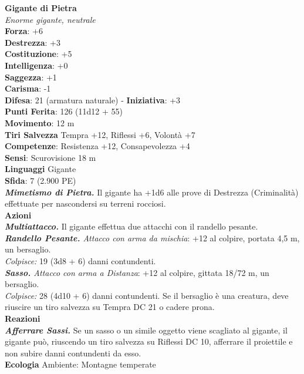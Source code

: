 \begin{multicols}{2}
\medskip\textbf{Gigante di Pietra}\\
\emph{Enorme gigante, neutrale}\\
\textbf{Forza}: +6\\
\textbf{Destrezza}: +3\\
\textbf{Costituzione}: +5\\
\textbf{Intelligenza}: +0\\
\textbf{Saggezza}: +1\\
\textbf{Carisma}: -1\\
\textbf{Difesa}: 21 (armatura naturale) - \textbf{Iniziativa}: +3\\
\textbf{Punti Ferita}: 126 (11d12 + 55)\\
\textbf{Movimento}: 12 m\\
\textbf{Tiri Salvezza} Tempra +12, Riflessi +6, Volontà +7\\
\textbf{Competenze}: Resistenza +12, Consapevolezza +4\\
\textbf{Sensi}: Scurovisione 18 m\\
\textbf{Linguaggi} Gigante\\
\textbf{Sfida}: 7 (2.900 PE)\smallskip\\
\emph{\textbf{Mimetismo di Pietra.}} Il gigante ha +1d6 alle prove di Destrezza (Criminalità) effettuate per nascondersi su terreni rocciosi.\\
\smallskip\textbf{Azioni}\\
\emph{\textbf{Multiattacco.}} Il gigante effettua due attacchi con il randello pesante.\\
\emph{\textbf{Randello Pesante.} Attacco con arma da mischia}: +12 al colpire, portata 4,5 m, un bersaglio.\\
\emph{Colpisce:} 19 (3d8 + 6) danni contundenti.\\
\emph{\textbf{Sasso.} Attacco con arma a Distanza}: +12 al colpire, gittata 18/72 m, un bersaglio.\\
\emph{Colpisce:} 28 (4d10 + 6) danni contundenti. Se il bersaglio è una creatura, deve riuscire un tiro salvezza su Tempra DC  21 o cadere prona.\\
\textbf{Reazioni}\\
\emph{\textbf{Afferrare Sassi.}} Se un sasso o un simile oggetto viene scagliato al gigante, il gigante può, riuscendo un tiro salvezza su Riflessi DC 10, afferrare il proiettile e non subire danni contundenti da esso.\\
\textbf{Ecologia}
Ambiente: Montagne temperate\\

\end{multicols}
